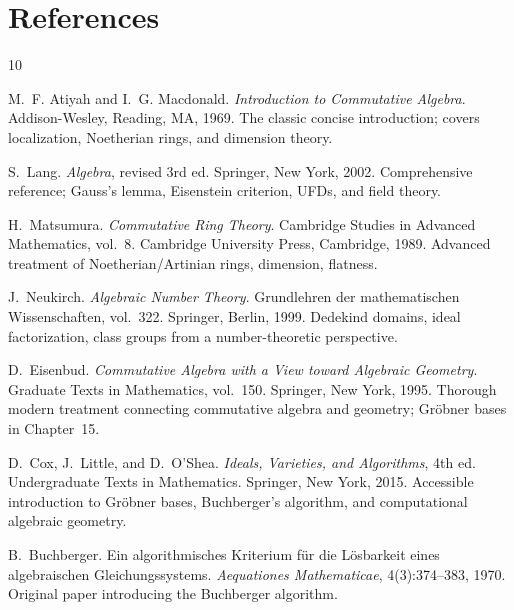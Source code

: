\documentclass[12pt,a4paper]{amsart}
\theoremstyle{definition}
\theoremstyle{definition}
\begin{document}
\section{References}

\begin{thebibliography}{10}

M.~F. Atiyah and I.~G. Macdonald.
\newblock \textit{Introduction to Commutative Algebra}.
\newblock Addison-Wesley, Reading, MA, 1969.
\newblock The classic concise introduction; covers localization, Noetherian rings, and
dimension theory.

S.~Lang.
\newblock \textit{Algebra}, revised 3rd ed.
\newblock Springer, New York, 2002.
\newblock Comprehensive reference; Gauss's lemma, Eisenstein criterion, UFDs, and
field theory.

H.~Matsumura.
\newblock \textit{Commutative Ring Theory}.
\newblock Cambridge Studies in Advanced Mathematics, vol.~8.
\newblock Cambridge University Press, Cambridge, 1989.
\newblock Advanced treatment of Noetherian/Artinian rings, dimension, flatness.

J.~Neukirch.
\newblock \textit{Algebraic Number Theory}.
\newblock Grundlehren der mathematischen Wissenschaften, vol.~322.
\newblock Springer, Berlin, 1999.
\newblock Dedekind domains, ideal factorization, class groups from a number-theoretic
perspective.

D.~Eisenbud.
\newblock \textit{Commutative Algebra with a View toward Algebraic Geometry}.
\newblock Graduate Texts in Mathematics, vol.~150.
\newblock Springer, New York, 1995.
\newblock Thorough modern treatment connecting commutative algebra and geometry;
Gröbner bases in Chapter~15.

D.~Cox, J.~Little, and D.~O'Shea.
\newblock \textit{Ideals, Varieties, and Algorithms}, 4th ed.
\newblock Undergraduate Texts in Mathematics.
\newblock Springer, New York, 2015.
\newblock Accessible introduction to Gröbner bases, Buchberger's algorithm, and
computational algebraic geometry.

B.~Buchberger.
\newblock Ein algorithmisches Kriterium für die Lösbarkeit eines algebraischen
Gleichungssystems.
\newblock \textit{Aequationes Mathematicae}, 4(3):374--383, 1970.
\newblock Original paper introducing the Buchberger algorithm.


\end{thebibliography}
\end{document}
